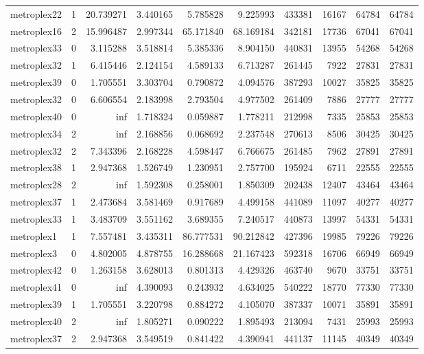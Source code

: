 \documentclass[../../../thesis.tex]{subfiles}
\begin{document}
\begin{longtable}{|l|r|r|r|r|r|r|r|r|r|}
metroplex22 & 1 & 20.739271 & 3.440165 & 5.785828 & 9.225993 & 433381 & 16167 & 64784 & 64784 \\
metroplex16 & 2 & 15.996487 & 2.997344 & 65.171840 & 68.169184 & 342181 & 17736 & 67041 & 67041 \\
metroplex33 & 0 & 3.115288 & 3.518814 & 5.385336 & 8.904150 & 440831 & 13955 & 54268 & 54268 \\
metroplex32 & 1 & 6.415446 & 2.124154 & 4.589133 & 6.713287 & 261445 & 7922 & 27831 & 27831 \\
metroplex39 & 0 & 1.705551 & 3.303704 & 0.790872 & 4.094576 & 387293 & 10027 & 35825 & 35825 \\
metroplex32 & 0 & 6.606554 & 2.183998 & 2.793504 & 4.977502 & 261409 & 7886 & 27777 & 27777 \\
metroplex40 & 0 & inf & 1.718324 & 0.059887 & 1.778211 & 212998 & 7335 & 25853 & 25853 \\
metroplex34 & 2 & inf & 2.168856 & 0.068692 & 2.237548 & 270613 & 8506 & 30425 & 30425 \\
metroplex32 & 2 & 7.343396 & 2.168228 & 4.598447 & 6.766675 & 261485 & 7962 & 27891 & 27891 \\
metroplex38 & 1 & 2.947368 & 1.526749 & 1.230951 & 2.757700 & 195924 & 6711 & 22555 & 22555 \\
metroplex28 & 2 & inf & 1.592308 & 0.258001 & 1.850309 & 202438 & 12407 & 43464 & 43464 \\
metroplex37 & 1 & 2.473684 & 3.581469 & 0.917689 & 4.499158 & 441089 & 11097 & 40277 & 40277 \\
metroplex33 & 1 & 3.483709 & 3.551162 & 3.689355 & 7.240517 & 440873 & 13997 & 54331 & 54331 \\
metroplex1 & 1 & 7.557481 & 3.435311 & 86.777531 & 90.212842 & 427396 & 19985 & 79226 & 79226 \\
metroplex3 & 0 & 4.802005 & 4.878755 & 16.288668 & 21.167423 & 592318 & 16706 & 66949 & 66949 \\
metroplex42 & 0 & 1.263158 & 3.628013 & 0.801313 & 4.429326 & 463740 & 9670 & 33751 & 33751 \\
metroplex41 & 0 & inf & 4.390093 & 0.243932 & 4.634025 & 540222 & 18770 & 77330 & 77330 \\
metroplex39 & 1 & 1.705551 & 3.220798 & 0.884272 & 4.105070 & 387337 & 10071 & 35891 & 35891 \\
metroplex40 & 2 & inf & 1.805271 & 0.090222 & 1.895493 & 213094 & 7431 & 25993 & 25993 \\
metroplex37 & 2 & 2.947368 & 3.549519 & 0.841422 & 4.390941 & 441137 & 11145 & 40349 & 40349 \\

\end{longtable}
\end{document}
